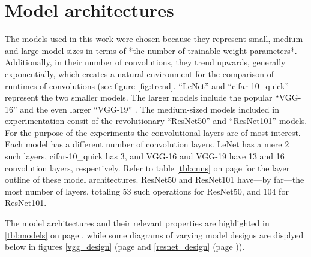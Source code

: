 \section{Model architectures}
The models used in this work were chosen because they represent small, medium and large model sizes in terms of *the number of trainable weight parameters*. Additionally, in their number of convolutions, they trend upwards, generally exponentially, which creates a natural environment for the comparison of runtimes of convolutions (see figure \ref{fig:trend}. ``LeNet'' \cite{mnist} and ``cifar-10\_quick'' \cite{cifar} represent the two smaller models. The larger models include the popular ``VGG-16'' and the even larger ``VGG-19'' \cite{return}. The medium-sized models included in experimentation consit of the revolutionary ``ResNet50'' and ``ResNet101'' \cite{resnets2} models. For the purpose of the experiments the convolutional layers are of most interest. Each model has a different number of convolution layers. LeNet has a mere 2 such layers, cifar-10\_quick has 3, and VGG-16 and VGG-19 have 13 and 16 convolution layers, respectively. Refer to table \ref{tbl:cnns} on page \pageref{tbl:cnns} for the layer outline of these model architectures. ResNet50 and ResNet101 have---by far---the most number of layers, totaling 53 such operations for ResNet50, and 104 for ResNet101.


The model architectures and their relevant properties are highlighted in \ref{tbl:models} on page \pageref{tbl:models}, while some diagrams of varying model designs are displyed below in figures \ref{vgg_design} (page \pageref {vgg_design} and \ref{resnet_design} (page \pageref{resnet_design})).




